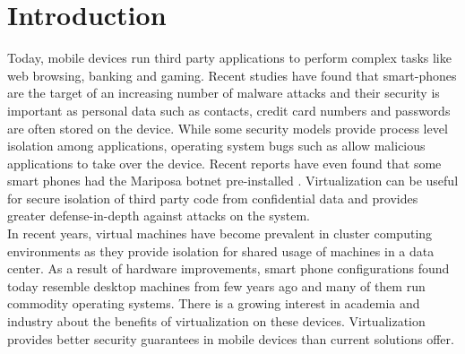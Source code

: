 \section{Introduction}
Today, mobile devices run third party applications to perform complex tasks like web browsing, banking and gaming. Recent studies have found that smart-phones are the target of an increasing number of malware attacks \cite{bose2006mobile, cybercriminals2007banks, iphone2010seriot} and their security is important as personal data such as contacts, credit card numbers and passwords are often stored on the device. While some security models \cite{androidsecurity} provide process level isolation among applications, operating system bugs such as \cite{sms2009iphone,opencore2009android,kernel2009vulnerability} allow malicious applications to take over the device. Recent reports have even found that some smart phones had the Mariposa botnet pre-installed \cite{mariposa2009android}. Virtualization can be useful for secure isolation of third party code from confidential data and provides greater defense-in-depth against attacks on the system.\\

In recent years, virtual machines have become prevalent in cluster computing environments \cite{gartner2009virtual} as they provide isolation for shared usage of machines in a data center. As a result of hardware improvements, smart phone configurations found today resemble desktop machines from few years ago and many of them run commodity operating systems. There is a growing interest in academia \cite{cox2007pocket} and industry \cite{vmware2009nextfrontier} about the benefits of virtualization on these devices. Virtualization provides better security guarantees in mobile devices than current solutions offer. \\

